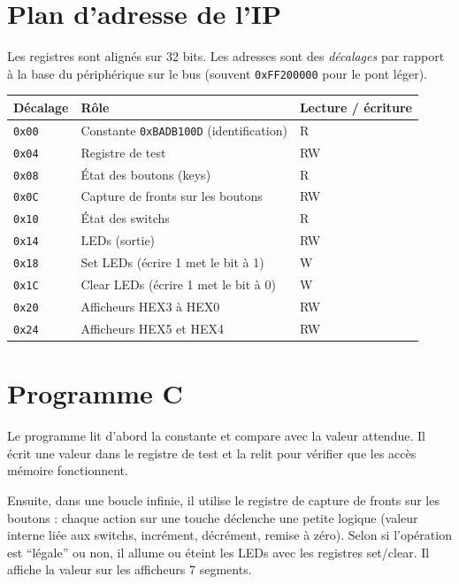 \documentclass[a4paper,12pt]{article}
\begin{document}
\section{Plan d'adresse de l'IP}

Les registres sont alignés sur 32 bits. Les adresses sont des \emph{décalages} par rapport à la base du périphérique sur le bus (souvent \texttt{0xFF200000} pour le pont léger).

\begin{center}
\begin{tabular}{|l|l|l|}
\hline
\textbf{Décalage} & \textbf{Rôle} & \textbf{Lecture / écriture} \\
\hline
\texttt{0x00} & Constante \texttt{0xBADB100D} (identification) & R \\
\texttt{0x04} & Registre de test & RW \\
\texttt{0x08} & État des boutons (keys) & R \\
\texttt{0x0C} & Capture de fronts sur les boutons & RW \\
\texttt{0x10} & État des switchs & R \\
\texttt{0x14} & LEDs (sortie) & RW \\
\texttt{0x18} & Set LEDs (écrire 1 met le bit à 1) & W \\
\texttt{0x1C} & Clear LEDs (écrire 1 met le bit à 0) & W \\
\texttt{0x20} & Afficheurs HEX3 à HEX0 & RW \\
\texttt{0x24} & Afficheurs HEX5 et HEX4 & RW \\
\hline
\end{tabular}
\end{center}

\section{Programme C}

Le programme lit d'abord la constante et compare avec la valeur attendue. Il écrit une valeur dans le registre de test et la relit pour vérifier que les accès mémoire fonctionnent.

Ensuite, dans une boucle infinie, il utilise le registre de capture de fronts sur les boutons : chaque action sur une touche déclenche une petite logique (valeur interne liée aux switchs, incrément, décrément, remise à zéro). Selon si l'opération est ``légale'' ou non, il allume ou éteint les LEDs avec les registres set/clear. Il affiche la valeur sur les afficheurs 7 segments.
\end{document}
